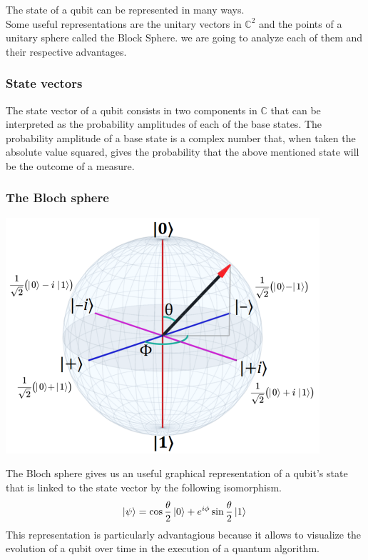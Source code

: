 \documentclass{article}
\begin{document}
The state of a qubit can be represented in many ways.\\
Some useful representations are the unitary vectors in $\mathbb{C}^2$
and the points of a unitary sphere called the Block Sphere.
we are going to analyze each of them and their respective advantages.

\subsubsection{State vectors}

The state vector of a qubit consists in two components in $\mathbb{C}$
that can be interpreted as the probability amplitudes of each of the
base states.
The probability amplitude of a base state is a complex number that,
when taken the absolute value squared, gives the probability that the
above mentioned state will be the outcome
of a measure. %


\subsubsection{The Bloch sphere}

\begin{center}
	\includegraphics[scale=0.5]{bloch-sphere.png}
\end{center}
The Bloch sphere gives us an useful graphical representation of a
qubit's state that is linked to the state vector by the following
isomorphism.\\

\begin{equation}
	\ket{\psi} = \cos{\dfrac{\theta}{2}}\ket{0}+e^{i\phi}\sin{\dfrac{\theta}{2}}\ket{1} \\
\end{equation}
This representation is particularly advantagious because it allows
to visualize the evolution of a qubit over time in the execution
of a quantum algorithm.
\end{document}
